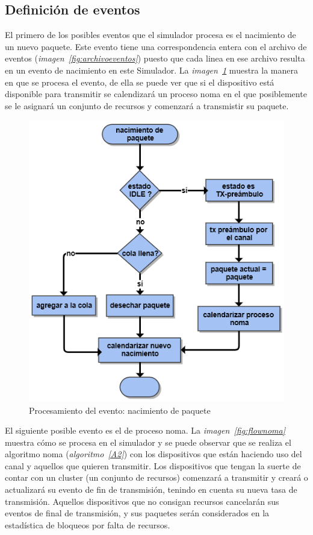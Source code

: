 \subsection{Definición de eventos}

El primero de los posibles eventos que el simulador procesa es el nacimiento de un nuevo paquete. Este evento tiene una correspondencia entera con el archivo de eventos (\textit{imagen~\ref{fig:archivoeventos}}) puesto que cada linea en ese archivo resulta en un evento de nacimiento en este Simulador. La \textit{imagen~\ref{fig:flownacimiento}} muestra la manera en que se procesa el evento, de ella se puede ver que si el dispositivo está disponible para transmitir se calendizará un proceso noma en el que posiblemente se le asignará un conjunto de recursos y comenzará a transmistir su paquete.\newline

\begin{figure}[th]
    \centering
    \includegraphics[scale=.7]{Figures/flownacimiento.png}
    \decoRule
    \caption[Procesamiento del evento: nacimiento de paquete]{Procesamiento del evento: nacimiento de paquete}
    \label{fig:flownacimiento}
\end{figure}

El siguiente posible evento es el de proceso noma. La \textit{imagen~\ref{fig:flownoma}} muestra cómo se procesa en el simulador y se puede observar que se realiza el algoritmo noma (\textit{algoritmo~\ref{A2}}) con los dispositivos que están haciendo uso del canal y aquellos que quieren transmitir. Los dispositivos que tengan la suerte de contar con un cluster (un conjunto de recursos) comenzará a transmitir y creará o actualizará su evento de fin de transmisión, tenindo en cuenta su nueva tasa de transmisión. Aquellos dispositivos que no consigan recursos cancelarán sus eventos de final de transmisión, y sus paquetes serán considerados en la estadística de bloqueos por falta de recursos. \newline

